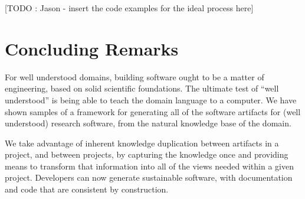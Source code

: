 \documentclass[sigconf,review]{acmart}
\begin{document}
[TODO : Jason - insert the code examples for the ideal process here]

\section{Concluding Remarks} \label{ch:concluding_remarks}

For well understood domains, building software ought to be a matter of
engineering, based on solid scientific foundations. The ultimate test of ``well
understood'' is being able to teach the domain language to a computer. We have
shown samples of a framework for generating all of the software artifacts for
(well understood) research software, from the natural knowledge base of the
domain.

We take advantage of inherent knowledge duplication between artifacts in a
project, and between projects, by capturing the knowledge once and providing
means to transform that information into all of the views needed within a given
project.  Developers can now generate sustainable software, with documentation
and code that are consistent by construction.



\end{document}
